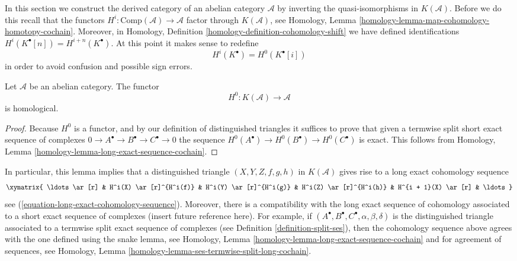 \noindent
In this section we construct the derived category of an abelian category
$\mathcal{A}$ by inverting the quasi-isomorphisms in $K(\mathcal{A})$.
Before we do this recall that the functors
$H^i : \text{Comp}(\mathcal{A}) \to \mathcal{A}$
factor through $K(\mathcal{A})$, see
Homology, Lemma \ref{homology-lemma-map-cohomology-homotopy-cochain}.
Moreover, in
Homology, Definition \ref{homology-definition-cohomology-shift}
we have defined identifications $H^i(K^\bullet[n]) = H^{i + n}(K^\bullet)$.
At this point it makes sense to redefine
$$
H^i(K^\bullet) = H^0(K^\bullet[i])
$$
in order to avoid confusion and possible sign errors.

\begin{lemma}
\label{lemma-cohomology-homological}
Let $\mathcal{A}$ be an abelian category. The functor
$$
H^0 : K(\mathcal{A}) \longrightarrow \mathcal{A}
$$
is homological.
\end{lemma}

\begin{proof}
Because $H^0$ is a functor, and by our definition of distinguished triangles
it suffices to prove that given a termwise split short exact sequence
of complexes $0 \to A^\bullet \to B^\bullet \to C^\bullet \to 0$
the sequence $H^0(A^\bullet) \to H^0(B^\bullet) \to H^0(C^\bullet)$
is exact. This follows from
Homology, Lemma \ref{homology-lemma-long-exact-sequence-cochain}.
\end{proof}

\noindent
In particular, this lemma implies that a distinguished triangle
$(X, Y, Z, f, g, h)$ in $K(\mathcal{A})$ gives rise to a long exact
cohomology sequence
\begin{equation}
\label{equation-long-exact-cohomology-sequence-D}
\xymatrix{
\ldots \ar[r] &
H^i(X) \ar[r]^{H^i(f)} &
H^i(Y) \ar[r]^{H^i(g)} &
H^i(Z) \ar[r]^{H^i(h)} &
H^{i + 1}(X) \ar[r] & \ldots
}
\end{equation}
see (\ref{equation-long-exact-cohomology-sequence}). Moreover, there is
a compatibility with the long exact sequence of cohomology associated to
a short exact sequence of complexes (insert future reference here). For
example, if $(A^\bullet, B^\bullet, C^\bullet, \alpha, \beta, \delta)$
is the distinguished triangle associated to a termwise split exact
sequence of complexes (see
Definition \ref{definition-split-ses}),
then the cohomology sequence above agrees with the one defined using the
snake lemma, see
Homology, Lemma \ref{homology-lemma-long-exact-sequence-cochain}
and for agreement of sequences, see
Homology, Lemma \ref{homology-lemma-ses-termwise-split-long-cochain}.

